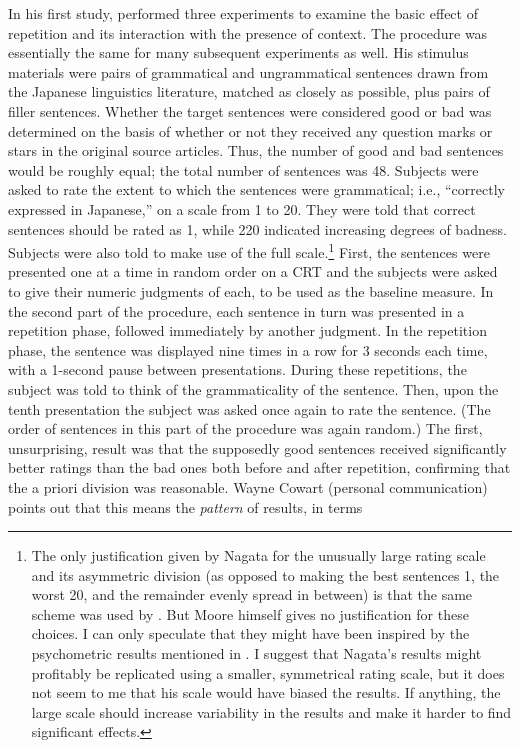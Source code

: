 In his first study, \citet{Nagata1988} performed three experiments to examine the basic effect of repetition and its interaction with the presence of context. The procedure was essentially the same for many subsequent experiments as well. His stimulus materials were pairs of grammatical and ungrammatical sentences drawn from the Japanese linguistics literature, matched as closely as possible, plus pairs of filler sentences. Whether the target sentences were considered good or bad was determined on the basis of whether or not they received any question marks or stars in the original source articles. Thus, the number of good and bad sentences would be roughly equal; the total number of sentences was 48. Subjects were asked to rate the extent to which the sentences were grammatical; i.e., ``correctly expressed in Japanese,'' on a scale from 1 to 20. They were told that correct sentences should be rated as 1, while 2\textendash{}20 indicated increasing degrees of badness. Subjects were also told to make use of the full scale.\footnote{The only justification given by Nagata for the unusually large rating scale and its asymmetric division (as opposed to making the best sentences 1, the worst 20, and the remainder evenly spread in between) is that the same scheme was used by \citet{Moore1972}. But Moore himself gives no justification for these choices. I can only speculate that they might have been inspired by the psychometric results mentioned in . I suggest that Nagata's results might profitably be replicated using a smaller, symmetrical rating scale, but it does not seem to me that his scale would have biased the results. If anything, the large scale should increase variability in the results and make it harder to find significant effects.} 
First, the sentences were presented one at a time in random order on a CRT and the subjects were asked to give their numeric judgments of each, to be used as the baseline measure. In the second part of the procedure, each sentence in turn was presented in a repetition phase, followed immediately by another judgment. In the repetition phase, the sentence was displayed nine times in a row for 3 seconds each time, with a 1-second pause between presentations. During these repetitions, the subject was told to think of the grammaticality of the sentence. Then, upon the tenth presentation the subject was asked once again to rate the sentence. (The order of sentences in this part of the procedure was again random.) The first, unsurprising, result was that the supposedly good sentences received significantly better ratings than the bad ones both before and after repetition, confirming that the a priori division was reasonable. Wayne Cowart (personal communication) points out that this means the \textit{pattern} of results, in terms
